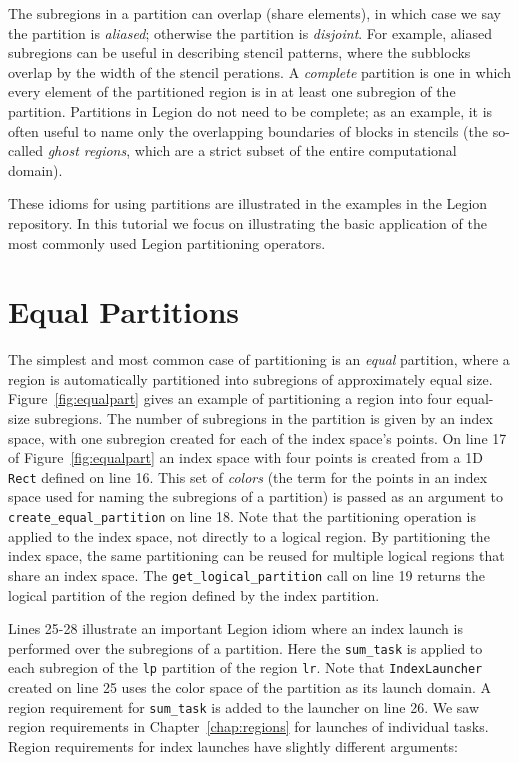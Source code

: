 The subregions in a partition can overlap (share elements), in which
case we say the partition is {\em aliased}; otherwise the partition is
{\em disjoint}.  For example, aliased subregions can be useful in
describing stencil patterns, where the subblocks overlap by the width
of the stencil perations.  A {\em complete} partition is one in which
every element of the partitioned region is in at least one subregion
of the partition.  Partitions in Legion do not need to be complete; as an example,
it is often useful to name only the overlapping boundaries of blocks in stencils (the so-called {\em ghost regions}, which are a strict subset of the entire computational domain).

These idioms for using partitions are illustrated in the examples in the Legion repository.  In this tutorial we focus on illustrating the basic application of
the most commonly used Legion partitioning operators.

\section{Equal Partitions}
\label{sec:equal}

The simplest and most common case of partitioning is an {\em equal}
partition, where a region is automatically partitioned into subregions
of approximately equal size.  Figure~\ref{fig:equalpart} gives an
example of partitioning a region into four equal-size subregions.  The
number of subregions in the partition is given by an index space, with
one subregion created for each of the index space's points.  On line
17 of Figure~\ref{fig:equalpart} an index space with four points is
created from a 1D {\tt Rect} defined on line 16.  This set of {\em
  colors} (the term for the points in an index space
used for naming the subregions of a partition) is passed as an
argument to {\tt create\_equal\_partition} on line 18.  Note that the
partitioning operation is applied to the index space, not directly to
a logical region.  By partitioning the index space, the same
partitioning can be reused for multiple logical regions that share an
index space.  The {\tt get\_logical\_partition} call on line 19
returns the logical partition of the region defined by the index
partition.

Lines 25-28 illustrate an important Legion idiom where an index launch is performed
over the subregions of a partition.  Here the {\tt sum\_task} is applied to each
subregion of the {\tt lp} partition of the region {\tt lr}.   Note that {\tt IndexLauncher} created on line 25 uses the color space of the partition as its launch domain.  A region requirement for {\tt sum\_task} is added to the launcher on line 26.
We saw region requirements in Chapter~\ref{chap:regions} for launches of individual
tasks.  Region requirements for index launches have slightly different arguments:

